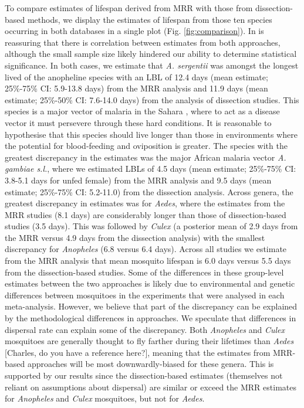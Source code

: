 \documentclass[]{article}
\begin{document}
To compare estimates of lifespan derived from MRR with those from
dissection-based methods, we display the estimates of lifespan from
those ten species occurring in both databases in a single plot (Fig. \ref{fig:comparison}). In is reassuring that there is correlation between estimates from both approaches, although the small sample size likely hindered our ability
to determine statistical significance. In both cases, we estimate that
\emph{A. sergentii} was amongst the longest lived of the anopheline
species with an LBL of 12.4 days (mean estimate;
25\%-75\% CI: 5.9-13.8 days) from the MRR analysis and 11.9 days (mean
estimate; 25\%-50\% CI: 7.6-14.0 days) from the analysis of dissection
studies. This species is a major vector of malaria in the Sahara \citep{sinka2010dominant}, where to act as a disease vector it must persevere
through these hard conditions. It is reasonable to hypothesise that this
species should live longer than those in environments where the
potential for blood-feeding and oviposition is greater. The species with
the greatest discrepancy in the estimates was the major African malaria
vector \emph{A. gambiae s.l.}, where we estimated LBLs of 4.5 days
(mean estimate; 25\%-75\% CI: 3.8-5.1 days for unfed female) from the
MRR analysis and 9.5 days (mean estimate; 25\%-75\% CI: 5.2-11.0) from
the dissection analysis. Across genera, the greatest discrepancy in estimates was for
\emph{Aedes}, where the estimates from the MRR studies (8.1 days) are considerably longer than those of dissection-based studies (3.5 days).
This was followed by \emph{Culex} (a posterior mean of 2.9 days from the
MRR versus 4.9 days from the dissection analysis) with the smallest
discrepancy for \emph{Anopheles} (6.8 versus 6.4 days). Across all studies we estimate
from the MRR analysis that mean mosquito lifespan is 6.0 days versus 5.5
days from the dissection-based studies. Some of the differences in these
group-level estimates between the two approaches is likely due to
environmental and genetic differences between mosquitoes in the
experiments that were analysed in each meta-analysis. However, we
believe that part of the discrepancy can be explained by the
methodological differences in approaches. We speculate that differences
in dispersal rate can explain some of the discrepancy. Both
\emph{Anopheles} and \emph{Culex} mosquitoes are generally thought to
fly farther during their lifetimes than \emph{Aedes} {[}Charles, do you
have a reference here?{]}, meaning that the estimates from MRR-based
approaches will be most downwardly-biased for these genera. This is
supported by our results since the dissection-based estimates
(themselves not reliant on assumptions about dispersal) are similar or exceed the MRR
estimates for \emph{Anopheles} and \emph{Culex} mosquitoes, but not for
\emph{Aedes}.
\end{document}

